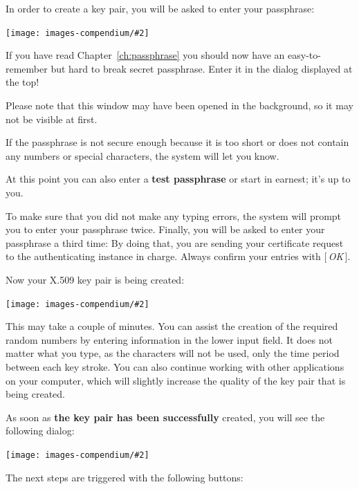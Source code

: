 \documentclass[a4paper,11pt,oneside,openright,titlepage]{scrbook}
\newcommand{\Button}[1]{[\,\textit{#1}\,]}
\newcommand{\IncludeImage}[2][]{
\begin{center}
  \texttt{[image: images-compendium/\#2]}%
\end{center}
}
\begin{document}
In order to create a key pair, you will be asked to enter your
passphrase:

\IncludeImage[width=0.45\textwidth]{sc-kleopatra-x509-pinentry_en}

If you have read Chapter~\ref{ch:passphrase} you should now have an
easy-to-remember but hard to break secret passphrase. Enter it in the
dialog displayed at the top!

Please note that this window may have been opened in the background,
so it may not be visible at first.

If the passphrase is not secure enough because it is too short or does
not contain any numbers or special characters, the system will let you
know.

At this point you can also enter a \textbf{test passphrase} or start
in earnest; it's up to you.

To make sure that you did not make any typing errors, the system will
prompt you to enter your passphrase twice.  Finally, you will be asked
to enter your passphrase a third time: By doing that, you are sending
your certificate request  to the
authenticating instance in charge.  Always confirm your entries with
\Button{OK}.

\clearpage
Now your X.509 key pair is being created:
\IncludeImage[width=0.85\textwidth]{sc-kleopatra-x509-createKey_en}

This may take a couple of minutes. You can assist the creation of the
required random numbers by entering information in the lower input
field.  It does not matter what you type, as the characters will
not be used, only the time period between each key stroke. You can also
continue working with other applications on your computer, which will
slightly increase the quality of the key pair that is being created.

\clearpage
As soon as \textbf{the key pair has been successfully} created, you
will see the following dialog:

\IncludeImage[width=0.85\textwidth]{sc-kleopatra-x509-keyPairCreated_en}

The next steps are triggered with the following buttons:
\end{document}
